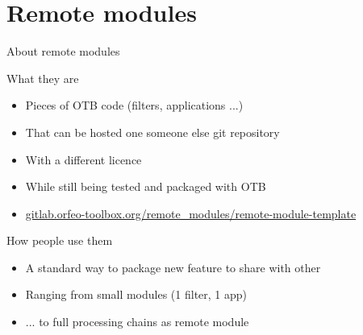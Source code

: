 \section{Remote modules}

\begin{frame}{About remote modules}
\begin{block}{What they are}
  \begin{itemize}
    \item Pieces of OTB code (filters, applications ...)
    \item That can be hosted one someone else git repository
    \item With a different licence
    \item While still being tested and packaged with OTB
    \item \url{gitlab.orfeo-toolbox.org/remote_modules/remote-module-template}
  \end{itemize}
\end{block}

\begin{block}{How people use them}
  \begin{itemize}
    \item A standard way to package new feature to share with other
    \item Ranging from small modules (1 filter, 1 app)
    \item ... to full processing chains as remote module
    \end{itemize}
\end{block}

  
\end{frame}

